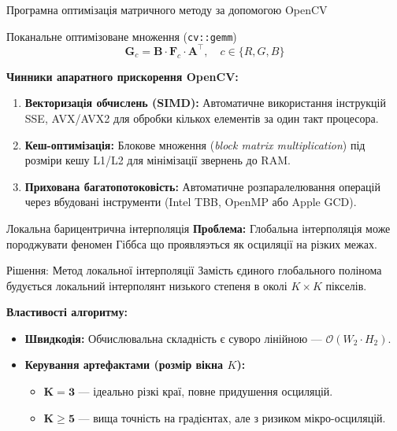 \documentclass[11pt, aspectratio=169]{beamer}
\begin{document}
\begin{frame}{Програмна оптимізація матричного методу за допомогою OpenCV}
	\begin{block}{Поканальне оптимізоване множення (\texttt{cv::gemm})}
		\vspace{-0.1cm}
		\begin{equation*}
			\mathbf{G}_c = \mathbf{B} \cdot \mathbf{F}_c \cdot \mathbf{A}^{\top}, \quad c \in \{R, G, B\}
		\end{equation*}
	\end{block}
	
	\vspace{0.1cm}
	\textbf{Чинники апаратного прискорення OpenCV:}
	\begin{enumerate}
		\item \textbf{Векторизація обчислень (SIMD):} Автоматичне використання інструкцій SSE, AVX/AVX2 для обробки кількох елементів за один такт процесора.
		\item \textbf{Кеш-оптимізація:} Блокове множення (\textit{block matrix multiplication}) під розміри кешу L1/L2 для мінімізації звернень до RAM.
		\item \textbf{Прихована багатопотоковість:} Автоматичне розпаралелювання операцій через вбудовані інструменти (Intel TBB, OpenMP або Apple GCD).
	\end{enumerate}
\end{frame}

\begin{frame}{Локальна барицентрична інтерполяція}
	\textbf{Проблема:} Глобальна інтерполяція може породжувати феномен Гіббса що проявляэться як осциляції на різких межах.
	
	\begin{block}{Рішення: Метод локальної інтерполяції}
		Замість єдиного глобального полінома будується локальний інтерполянт низького степеня в околі $K \times K$ пікселів.
	\end{block}
	
	\vspace{0.4cm}
	\textbf{Властивості алгоритму:}
	\begin{itemize}
		\item \textbf{Швидкодія:} Обчислювальна складність є суворо лінійною — $\mathcal{O}(W_2 \cdot H_2)$.
		\item \textbf{Керування артефактами (розмір вікна $K$):}
		\begin{itemize}
			\item $\mathbf{K = 3}$  — ідеально різкі краї, повне придушення осциляцій.
			\item $\mathbf{K \ge 5}$ — вища точність на градієнтах, але з ризиком мікро-осциляцій.
		\end{itemize}
	\end{itemize}
\end{frame}
\end{document}
